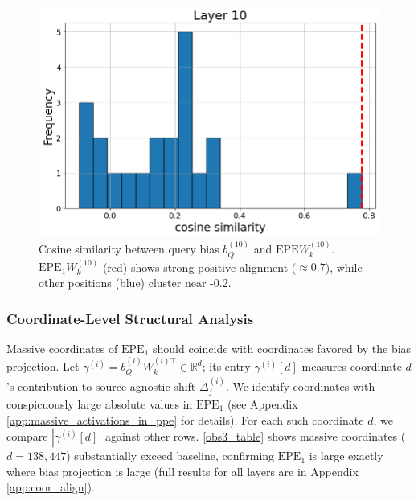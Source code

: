 \documentclass[11pt]{article}
\begin{document}
\begin{figure}[t]
  \includegraphics[width=\columnwidth]{figures/obs2_layer10.png}
  \caption{Cosine similarity between query bias $b_Q^{(10)}$ and $\mathrm{EPE}W_k^{(10)}$. $\mathrm{EPE}_1W_k^{(10)}$ (red) shows strong positive alignment ($\approx 0.7$), while other positions (blue) cluster near -0.2.}
  \label{fig:obs2_layer10}
\end{figure}

\subsubsection{Coordinate-Level Structural Analysis}
\label{sec:wk_structure}
Massive coordinates of $\mathrm{EPE}_1$ should coincide with coordinates favored by the bias projection. Let $\gamma^{(i)}=b_Q^{(i)}W_k^{(i)\top}\in\mathbb{R}^d$; its entry $\gamma^{(i)}[d]$ measures coordinate $d$'s contribution to source-agnostic shift $\Delta_j^{(i)}$. We identify coordinates with conspicuously large absolute values in 
$\mathrm{EPE}_1$ (see Appendix \ref{app:massive_activations_in_ppe} for 
details). For each such coordinate $d$, we compare $|\gamma^{(i)}[d]|$ against other rows. \cref{obs3_table} shows massive coordinates ($d{=}138,447$) substantially exceed baseline, confirming $\mathrm{EPE}_1$ is large exactly where bias projection is large (full results for all layers are in Appendix \ref{app:coor_align}).
\end{document}
